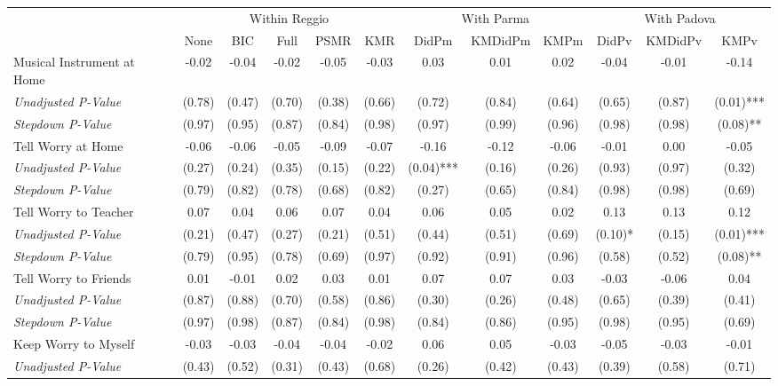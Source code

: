 \begin{tabular}{l c c c c c c c c c c c}
\toprule
& \multicolumn{5}{c}{Within Reggio} & \multicolumn{3}{c}{With Parma} & \multicolumn{3}{c}{With Padova} \\\cmidrule(lr){2-6} \cmidrule(lr){7-9} \cmidrule(lr){10-12}
 & None & BIC & Full & PSMR & KMR & DidPm & KMDidPm & KMPm & DidPv & KMDidPv & KMPv \\
\midrule
Musical Instrument at Home & -0.02 & -0.04 & -0.02 & -0.05 & -0.03 & 0.03 & 0.01 & 0.02 & -0.04 & -0.01 & -0.14 \\
\quad \textit{Unadjusted P-Value} & (0.78) & (0.47) & (0.70) & (0.38) & (0.66) & (0.72) & (0.84) & (0.64) & (0.65) & (0.87) & (0.01)*** \\
\quad \textit{Stepdown P-Value} & (0.97) & (0.95) & (0.87) & (0.84) & (0.98) & (0.97) & (0.99) & (0.96) & (0.98) & (0.98) & (0.08)** \\
Tell Worry at Home & -0.06 & -0.06 & -0.05 & -0.09 & -0.07 & -0.16 & -0.12 & -0.06 & -0.01 & 0.00 & -0.05 \\
\quad \textit{Unadjusted P-Value} & (0.27) & (0.24) & (0.35) & (0.15) & (0.22) & (0.04)*** & (0.16) & (0.26) & (0.93) & (0.97) & (0.32) \\
\quad \textit{Stepdown P-Value} & (0.79) & (0.82) & (0.78) & (0.68) & (0.82) & (0.27) & (0.65) & (0.84) & (0.98) & (0.98) & (0.69) \\
Tell Worry to Teacher & 0.07 & 0.04 & 0.06 & 0.07 & 0.04 & 0.06 & 0.05 & 0.02 & 0.13 & 0.13 & 0.12 \\
\quad \textit{Unadjusted P-Value} & (0.21) & (0.47) & (0.27) & (0.21) & (0.51) & (0.44) & (0.51) & (0.69) & (0.10)* & (0.15) & (0.01)*** \\
\quad \textit{Stepdown P-Value} & (0.79) & (0.95) & (0.78) & (0.69) & (0.97) & (0.92) & (0.91) & (0.96) & (0.58) & (0.52) & (0.08)** \\
Tell Worry to Friends & 0.01 & -0.01 & 0.02 & 0.03 & 0.01 & 0.07 & 0.07 & 0.03 & -0.03 & -0.06 & 0.04 \\
\quad \textit{Unadjusted P-Value} & (0.87) & (0.88) & (0.70) & (0.58) & (0.86) & (0.30) & (0.26) & (0.48) & (0.65) & (0.39) & (0.41) \\
\quad \textit{Stepdown P-Value} & (0.97) & (0.98) & (0.87) & (0.84) & (0.98) & (0.84) & (0.86) & (0.95) & (0.98) & (0.95) & (0.69) \\
Keep Worry to Myself & -0.03 & -0.03 & -0.04 & -0.04 & -0.02 & 0.06 & 0.05 & -0.03 & -0.05 & -0.03 & -0.01 \\
\quad \textit{Unadjusted P-Value} & (0.43) & (0.52) & (0.31) & (0.43) & (0.68) & (0.26) & (0.42) & (0.43) & (0.39) & (0.58) & (0.71) \\

\end{tabular}
